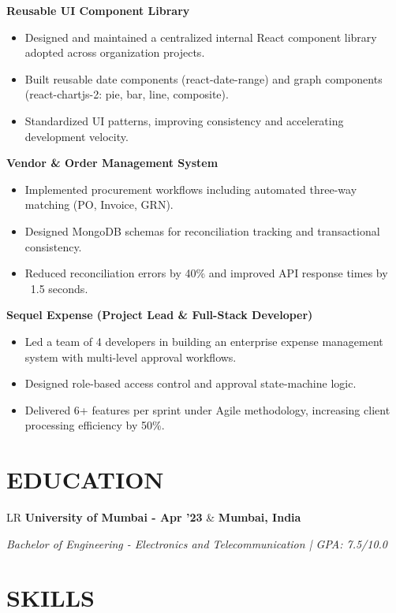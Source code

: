 \documentclass[11pt,a4paper]{moderncv}
\newcommand*{\educationentry}[3]{
    \begin{tabularx}{\textwidth}{LR}
        {\bfseries #1} & {\bfseries #2} \\
    \end{tabularx}
    {\itshape #3}
}
\begin{document}
\textbf{Reusable UI Component Library}
\begin{itemize}
    \item Designed and maintained a centralized internal React component library adopted across organization projects.
    \item Built reusable date components (react-date-range) and graph components (react-chartjs-2: pie, bar, line, composite).
    \item Standardized UI patterns, improving consistency and accelerating development velocity.
\end{itemize}

\textbf{Vendor \& Order Management System}
\begin{itemize}
    \item Implemented procurement workflows including automated three-way matching (PO, Invoice, GRN).
    \item Designed MongoDB schemas for reconciliation tracking and transactional consistency.
    \item Reduced reconciliation errors by 40\% and improved API response times by ~1.5 seconds.
\end{itemize}

\textbf{Sequel Expense (Project Lead \& Full-Stack Developer)}
\begin{itemize}
    \item Led a team of 4 developers in building an enterprise expense management system with multi-level approval workflows.
    \item Designed role-based access control and approval state-machine logic.
    \item Delivered 6+ features per sprint under Agile methodology, increasing client processing efficiency by 50\%.
\end{itemize}

\section{EDUCATION}

\educationentry
{University of Mumbai - Apr '23}
{Mumbai, India}
{Bachelor of Engineering - Electronics and Telecommunication \quad | \quad GPA: 7.5/10.0}

\section{SKILLS}
\end{document}
